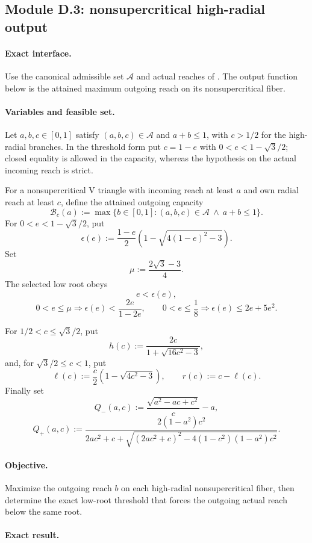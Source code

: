 \subsection{Module D.3: nonsupercritical high-radial output}
\label{subsec:app-finite-output-functions}

\paragraph{Exact interface.}
Use the canonical admissible set $\mathcal A$ and actual reaches of
.  The output function below is the
attained maximum outgoing reach on its nonsupercritical fiber.

\paragraph{Variables and feasible set.}
Let $a,b,c\in[0,1]$ satisfy $(a,b,c)\in\mathcal A$ and $a+b\le1$, with
$c>1/2$ for the high-radial branches.  In the threshold form put $c=1-e$
with $0<e<1-\sqrt3/2$; closed equality is allowed in the capacity, whereas
the hypothesis on the actual incoming reach is strict.

For a nonsupercritical V triangle with incoming reach at least $a$ and own
radial reach at least $c$, define the attained outgoing capacity
\[
 \mathcal B_c(a):=
 \max\{b\in[0,1]:(a,b,c)\in\mathcal A\ \land\ a+b\le1\}.
\]
For $0<e<1-\sqrt3/2$, put
\[
 \epsilon(e):=\frac{1-e}{2}
 \left(1-\sqrt{4(1-e)^2-3}\right).
\]
Set
\[
 \mu:=\frac{2\sqrt3-3}{4}.
\]
The selected low root obeys
\[
 e<\epsilon(e),
\]
\[
 0<e\le\mu\Longrightarrow
 \epsilon(e)<\frac{2e}{1-2e},
 \qquad
 0<e\le\frac18\Longrightarrow\epsilon(e)\le2e+5e^2.
\]

For $1/2<c\le\sqrt3/2$, put
\[
 h(c):=\frac{2c}{1+\sqrt{16c^2-3}},
\]
and, for $\sqrt3/2\le c<1$, put
\[
 \ell(c):=\frac c2\left(1-\sqrt{4c^2-3}\right),
 \qquad r(c):=c-\ell(c).
\]
Finally set
\[
 Q_-(a,c):=\frac{\sqrt{a^2-ac+c^2}}c-a,
\]
\[
 Q_+(a,c):=
 \frac{2(1-a^2)c^2}
 {2ac^2+c+
 \sqrt{(2ac^2+c)^2-4(1-c^2)(1-a^2)c^2}}.
\]

\paragraph{Objective.}
Maximize the outgoing reach $b$ on each high-radial nonsupercritical fiber,
then determine the exact low-root threshold that forces the outgoing actual
reach below the same root.

\paragraph{Exact result.}

